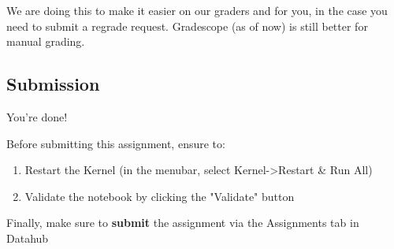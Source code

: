 \documentclass[11pt]{article}
\providecommand{\tightlist}{%
      \setlength{\itemsep}{0pt}\setlength{\parskip}{0pt}}
\begin{document}
We are doing this to make it easier on our graders and for you, in the
case you need to submit a regrade request. Gradescope (as of now) is
still better for manual grading.

    \subsection{Submission}\label{submission}

You're done!

Before submitting this assignment, ensure to:

\begin{enumerate}
\def\labelenumi{\arabic{enumi}.}
\tightlist
\item
  Restart the Kernel (in the menubar, select
  Kernel-\textgreater{}Restart \& Run All)
\item
  Validate the notebook by clicking the "Validate" button
\end{enumerate}

Finally, make sure to \textbf{submit} the assignment via the Assignments
tab in Datahub


    
    
    
    
\end{document}
